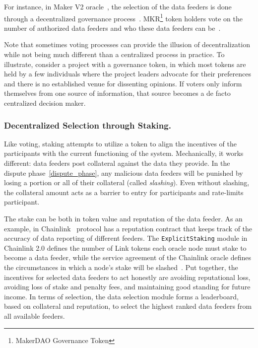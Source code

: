 For instance, in Maker V2 oracle~\cite{MAKERDAOOracle}, the selection of the data feeders is done through a decentralized governance process~\cite{gu2020empirical}. MKR\footnote{MakerDAO Governance Token} token holders vote on the number of authorized data feeders and who these data feeders can be~\cite{coinmonkMKRgovernance}. 


Note that sometimes voting processes can provide the illusion of decentralization while not being much different than a centralized process in practice. To illustrate, consider a project with a governance token, in which most tokens are held by a few individuals where the project leaders advocate for their preferences and there is no established venue for dissenting opinions. If voters only inform themselves from one source of information, that source becomes a de facto centralized decision maker. 

\subsubsection{Decentralized Selection through Staking.} Like voting, staking attempts to utilize a token to align the incentives of the participants with the current functioning of the system. Mechanically, it works different: data feeders post collateral against the data they provide. In the dispute phase~\ref{dispute_phase}, any malicious data feeders will be punished by losing a portion or all of their collateral (called \textit{slashing}). Even without slashing, the collateral amount acts as a barrier to entry for participants and rate-limits participant.  

The stake can be both in token value and reputation of the data feeder. As an example, in Chainlink~\cite{ellis2017chainlink} protocol has a reputation contract that keeps track of the accuracy of data reporting of different feeders. The \texttt{ExplicitStaking} module in Chainlink 2.0 defines the number of Link tokens each oracle node must stake to become a data feeder, while the service agreement of the Chainlink oracle defines the circumstances in which a node's stake will be slashed~\cite{chainlinkExplicitStaking}. Put together, the incentives for selected data feeders to act honestly are avoiding reputational loss, avoiding loss of stake and penalty fees, and maintaining good standing for future income. In terms of selection, the data selection module forms a leaderboard, based on collateral and reputation, to select the highest ranked data feeders from all available feeders.

